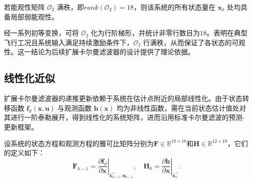 若能观性矩阵 $\mathcal{O}_2$ 满秩，即$rank(\mathcal{O}_2) = 18$，则该系统的所有状态量在 $\boldsymbol{x}_k$ 处均具备局部弱能观性。

经一系列初等变换，可将 $\mathcal{O}_2$ 化为行阶梯形，并统计非零行数目为$18$。表明在典型飞行工况且系统输入满足持续激励条件下，$\mathcal{O}_2$ 行满秩，从而保证了各状态的可观性。这一结论为后续扩展卡尔曼滤波器的设计提供了理论依据。

\subsection{线性化近似} %
扩展卡尔曼滤波器的递推更新依赖于系统在估计点附近的局部线性化。由于状态转移函数 $\boldsymbol{f}_d(\boldsymbol{x}, \boldsymbol{u})$ 与观测函数 $\boldsymbol{h}(\boldsymbol{x})$ 均为非线性函数，需在当前状态估计值处对其进行一阶泰勒展开，得到线性化的系统矩阵，进而沿用标准卡尔曼滤波的预测-更新框架。

设系统的状态方程和观测方程的雅可比矩阵分别为$\boldsymbol{F} \in \mathbb{R}^{18 \times 18}$和$\boldsymbol{H} \in \mathbb{R}^{12 \times 18}$，它们的定义如下：
\begin{equation}
    \boldsymbol{F}_{k-1} = \left. \frac{\partial \boldsymbol{f}_d}{\partial \boldsymbol{x}} \right|_{\hat{\boldsymbol{x}}_{k-1}^+, \boldsymbol{u}_{k-1}}, \quad \boldsymbol{H}_{k} = \left. \frac{\partial \boldsymbol{h}}{\partial \boldsymbol{x}} \right|_{\hat{\boldsymbol{x}}_{k}^+}.
\end{equation}

